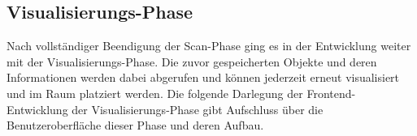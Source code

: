 \subsection{Visualisierungs-Phase} 
Nach vollständiger Beendigung der Scan-Phase ging es in der Entwicklung weiter mit der Visualisierungs-Phase. Die zuvor gespeicherten Objekte und 
deren Informationen werden dabei abgerufen und können jederzeit erneut visualisiert und im Raum platziert werden. Die folgende Darlegung der 
Frontend-Entwicklung der Visualisierungs-Phase gibt Aufschluss über die Benutzeroberfläche dieser Phase und deren Aufbau. %

